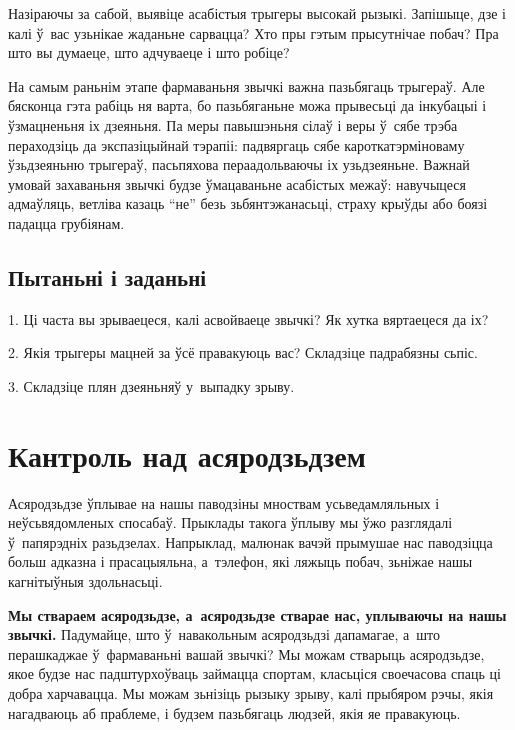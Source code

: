 Назіраючы за сабой, выявіце асабістыя трыгеры высокай рызыкі. Запішыце, дзе і калі ў~вас узьнікае жаданьне сарвацца? Хто пры гэтым прысутнічае побач? Пра што вы думаеце, што адчуваеце і што робіце?


На самым раньнім этапе фармаваньня звычкі важна пазьбягаць трыгераў. Але бясконца гэта рабіць ня варта, бо пазьбяганьне можа прывесьці да інкубацыі і ўзмацненьня іх дзеяньня. Па меры павышэньня сілаў і веры ў~сябе трэба пераходзіць да экспазіцыйнай тэрапіі: падвяргаць сябе кароткатэрміноваму ўзьдзеяньню трыгераў, пасьпяхова пераадольваючы іх узьдзеяньне. Важнай умовай захаваньня звычкі будзе ўмацаваньне асабістых межаў: навучыцеся адмаўляць, ветліва казаць ``не'' безь зьбянтэжанасьці, страху крыўды або боязі падацца грубіянам.

\subsection*{Пытаньні і заданьні}

1. Ці часта вы зрываецеся, калі асвойваеце звычкі? Як хутка вяртаецеся да іх?

2. Якія трыгеры мацней за ўсё правакуюць вас? Складзіце падрабязны сьпіс.

3. Складзіце плян дзеяньняў у~выпадку зрыву.


\section{Кантроль над асяродзьдзем}

Асяродзьдзе ўплывае на нашы паводзіны мноствам усьведамляльных і неўсьвядомленых спосабаў. Прыклады такога ўплыву мы ўжо разглядалі ў~папярэдніх разьдзелах. Напрыклад, малюнак вачэй прымушае нас паводзіцца больш адказна і прасацыяльна, а~тэлефон, які ляжыць побач, зьніжае нашы кагнітыўныя здольнасьці. 

\textbf{Мы ствараем асяродзьдзе, а~асяродзьдзе стварае нас, уплываючы на нашы звычкі.} Падумайце, што ў~навакольным асяродзьдзі дапамагае, а~што перашкаджае ў~фармаваньні вашай звычкі? Мы можам стварыць асяродзьдзе, якое будзе нас падштурхоўваць займацца спортам, класьціся своечасова спаць ці добра харчавацца. Мы можам зьнізіць рызыку зрыву, калі прыбяром рэчы, якія нагадваюць аб праблеме, і будзем пазьбягаць людзей, якія яе правакуюць.

